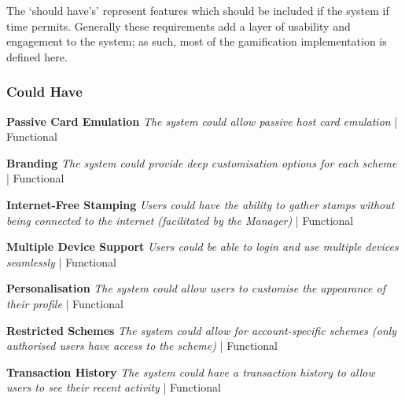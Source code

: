 The `should have's' represent features which should be included if the system if time permits. Generally these requirements add a layer of usability and engagement to the system; as such, most of the gamification implementation is defined here.

\subsubsection{Could Have}
\begin{description}[leftmargin=!,labelwidth=\widthof{\bfseries Medium}]
    \item[C1] \textbf{Passive Card Emulation} \newline
        \textit{The system could allow passive host card emulation}  | Functional

    \item[C2] \textbf{Branding} \newline
        \textit{The system could provide deep customisation options for each scheme}  | Functional

    \item[C3] \textbf{Internet-Free Stamping} \newline
        \textit{Users could have the ability to gather stamps without being connected to the internet (facilitated by the Manager)}  | Functional
        
    \item[C4] \textbf{Multiple Device Support} \newline
        \textit{Users could be able to login and use multiple devices seamlessly}  | Functional
        
    \item[C5] \textbf{Personalisation} \newline
        \textit{The system could allow users to customise the appearance of their profile}  | Functional
        
    \item[C6] \textbf{Restricted Schemes} \newline
        \textit{The system could allow for account-specific schemes (only authorised users have access to the scheme)}  | Functional
        
    \item[C7] \textbf{Transaction History} \newline
        \textit{The system could have a transaction history to allow users to see their recent activity}  | Functional
\end{description}

